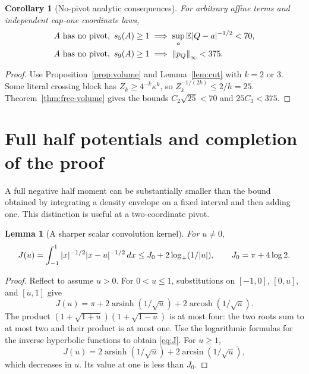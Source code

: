 \documentclass[11pt]{article}
\numberwithin{equation}{section}
\newtheorem{lemma}[theorem]{Lemma}
\newtheorem{corollary}[theorem]{Corollary}
\theoremstyle{definition}\newtheorem{definition}[theorem]{Definition}
\theoremstyle{remark}\newtheorem{remark}[theorem]{Remark}
\newcommand{\1}{\mathbf 1}\newcommand{\diag}{\operatorname{diag}}
\newcommand{\norm}[1]{\left\lVert#1\right\rVert}\newcommand{\abs}[1]{\left|#1\right|}
\begin{document}
\begin{corollary}[No-pivot analytic consequences]\label{cor:no-pivot}
For arbitrary affine terms and independent cap-one coordinate laws,
\begin{align}
 A\text{ has no pivot},\ s_5(A)\ge1
 &\implies\sup_a\E|Q-a|^{-1/2}<70,\label{eq:no-pivot-five}\\
 A\text{ has no pivot},\ s_9(A)\ge1
 &\implies\norm{p_Q}_\infty<375.\label{eq:no-pivot-nine}
\end{align}
\end{corollary}
\begin{proof}
Use Proposition~\ref{prop:volume} and Lemma~\ref{lem:cut} with $k=2$ or $3$. Some literal crossing block has $Z_k\ge4^{-k}\kappa^k$, so $Z_k^{-1/(2k)}\le2/h=25$. Theorem~\ref{thm:free-volume} gives the bounds $C_2\sqrt{25}<70$ and $25C_3<375$.
\end{proof}

\section{Full half potentials and completion of the proof}\label{sec:finish}
A full negative half moment can be substantially smaller than the bound obtained by integrating a density envelope on a fixed interval and then adding one. This distinction is useful at a two-coordinate pivot.

\begin{lemma}[A sharper scalar convolution kernel]\label{lem:kernels}
For $u\ne0$,
\begin{equation}\label{eq:J}
 J(u)=\int_{-1}^1|x|^{-1/2}|x-u|^{-1/2}\,dx
 \le J_0+2\log_+(1/|u|),\qquad J_0=\pi+4\log2.
\end{equation}
\end{lemma}
\begin{proof}
Reflect to assume $u>0$. For $0<u\le1$, substitutions on $[-1,0]$, $[0,u]$, and $[u,1]$ give
\[
 J(u)=\pi+2\operatorname{arsinh}(1/\sqrt u)
          +2\operatorname{arcosh}(1/\sqrt u).
\]
The product $(1+\sqrt{1+u})(1+\sqrt{1-u})$ is at most four: the two roots sum to at most two and their product is at most one. Use the logarithmic formulas for the inverse hyperbolic functions to obtain \eqref{eq:J}. For $u\ge1$,
\[
 J(u)=2\operatorname{arsinh}(1/\sqrt u)+2\arcsin(1/\sqrt u),
\]
which decreases in $u$. Its value at one is less than $J_0$.
\end{proof}
\end{document}
